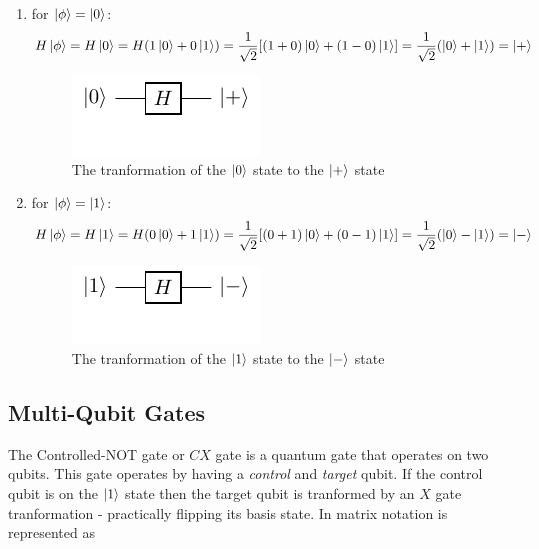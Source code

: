 \begin{enumerate}
    \item for $\ket{\phi} = \ket{0}$:
    \begin{equation}
        H\ket{\phi}=H\ket{0}=
        H(1\ket{0}+0\ket{1})=
        \frac{1}{\sqrt{2}}[(1+0)\ket{0}+(1-0)\ket{1}]=
        \frac{1}{\sqrt{2}}(\ket{0}+\ket{1})=\ket{+}
    \end{equation}
    \begin{figure}[ht]
        \centering
        \includegraphics{images/3_Quantum_Computing/hadamard_gate_basis0.pdf}
        \caption{The tranformation of the $\ket{0}$ state to the $\ket{+}$ state}
    \end{figure}
    \item for $\ket{\phi} = \ket{1}$:
    \begin{equation}
        H\ket{\phi}=H\ket{1}=
        H(0\ket{0}+1\ket{1})=
        \frac{1}{\sqrt{2}}[(0+1)\ket{0}+(0-1)\ket{1}]=
        \frac{1}{\sqrt{2}}(\ket{0}-\ket{1})=\ket{-}
    \end{equation}
    \begin{figure}[ht]
        \centering
        \includegraphics{images/3_Quantum_Computing/hadamard_gate_basis1.pdf}
        \caption{The tranformation of the $\ket{1}$ state to the $\ket{-}$ state}
    \end{figure}
\end{enumerate}

\subsection{Multi-Qubit Gates}

The Controlled-NOT gate or $CX$ gate is a quantum gate that operates on two qubits.
This gate operates by having a \textit{control} and \textit{target} qubit. If
the control qubit is on the $\ket{1}$ state then the target qubit is tranformed
by an $X$ gate tranformation - practically flipping its basis state. In matrix
notation is represented as

